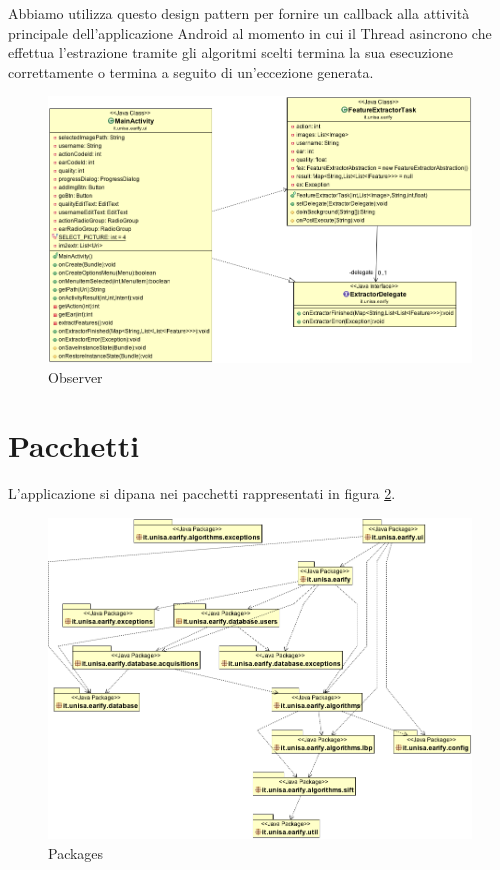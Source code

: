 Abbiamo utilizza questo design pattern per fornire un callback alla attività principale dell'applicazione Android al momento in cui il Thread asincrono che effettua l'estrazione tramite gli algoritmi scelti termina la sua esecuzione correttamente o termina a seguito di un'eccezione generata.

\begin{figure}[ht]
	\centering
	\includegraphics[width=1.5\textwidth, angle=90]{img/delegation.png}
	\caption{Observer}\label{fig:delegation}
\end{figure}

\section{Pacchetti}
L'applicazione si dipana nei pacchetti rappresentati in figura \ref{fig:pkg}.

\begin{figure}[ht]
	\centering
	\includegraphics[width=1.5\textwidth, angle=90]{img/pkg.png}
	\caption{Packages}\label{fig:pkg}
\end{figure}

